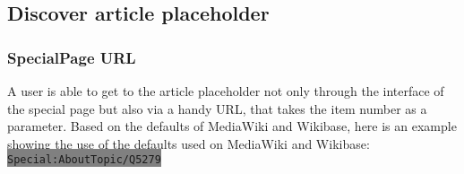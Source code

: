 \subsection{Discover article placeholder}
\subsubsection{SpecialPage URL}
A user is able to get to the article placeholder not only through the interface of the special page but also via a handy URL, that takes the item number as a parameter. Based on the defaults of MediaWiki and Wikibase, here is an example showing the use of the defaults used on MediaWiki and Wikibase: \colorbox{Gray}{\lstinline[basicstyle=\ttfamily\color{white}]|Special:AboutTopic/Q5279|}  \\

